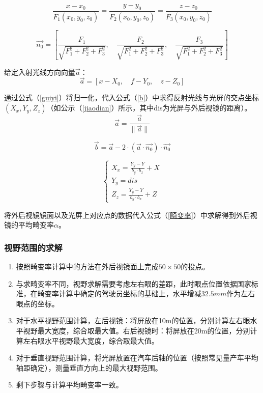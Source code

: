 \documentclass[withoutpreface,bwprint]{cumcmthesis} %
\begin{document}
\begin{equation}
\label{faxian}
	\frac{x - x_0}{F_1(x_0,y_0,z_0)} = \frac{y - y_0}{F_2(x_0,y_0,z_0)} = \frac{z - z_0}{F_3(x_0,y_0,z_0)} 
\end{equation}

\begin{equation}
\label{faxiangliang}
	\vec{n_0} = \left[\frac{F_1}{\sqrt{F_1^2+F_2^2+F_3^2}},\quad \frac{F_2}{\sqrt{F_1^2+F_2^2+F_3^2}},\quad \frac{F_3}{\sqrt{F_1^2+F_2^2+F_3^2}}\right]
\end{equation}
\par 给定入射光线方向向量$\vec{a}$：
\begin{equation}
	\vec{a} = [x - X_0,\quad f - Y_0, \quad z - Z_0 ]
\end{equation}
\par 通过公式（\ref{guiyi}）将归一化，代入公式（\ref{b}）中求得反射光线与光屏的交点坐标$(X_x,Y_y,Z_z)$（如公示（\ref{jiaodian}）所示，其中dis为光屏与外后视镜的距离）。
\begin{equation}
\label{guiyi}
	\vec{a} = \frac{\vec{a}}{\|\vec{a}\|}   
\end{equation}

\begin{equation}
\label{b}
	\vec{b} = \vec{a} - 2 \cdot (\vec{a} \cdot \vec{n_0}) \cdot \vec{n_0}
\end{equation}

\begin{equation}
\label{jiaodian}
	\begin{cases}
		X_x = \frac{Y_y - Y}{b_y \cdot b_x} + X \\
		Y_y = dis \\
		Z_z = \frac{Y_y - Y}{b_y \cdot b_x} + Z
	\end{cases}
\end{equation}

\par 将外后视镜镜面以及光屏上对应点的数据代入公式（\ref{畸变率}）中求解得到外后视镜的平均畸变率$\alpha$。

\subsubsection{视野范围的求解}
\begin{enumerate}
	\item 按照畸变率计算中的方法在外后视镜面上完成$50\times50$的投点。
	\item 与求畸变率不同，视野求解需要考虑左右眼的差距，此时眼点位置依据国家标准，在畸变率计算中确定的驾驶员坐标的基础上，水平增减$32.5mm$作为左右眼点的坐标。
	\item 对于水平视野范围计算，左后视镜：将屏放在10m的位置，分别计算左右眼水平视野最大宽度，综合取最大值。右后视镜时：将屏放在20m的位置，分别计算左右眼水平视野最大宽度，综合取最大值。
	\item 对于垂直视野范围计算，将光屏放置在汽车后轴的位置（按照常见量产车平均轴距确定），测量垂直方向上的最大视野范围。
	\item 剩下步骤与计算平均畸变率一致。
\end{enumerate}
\end{document}
